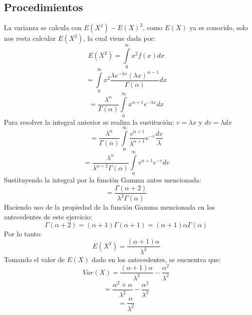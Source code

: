 \documentclass[12pt,letterpaper]{article}
\begin{document}
\subsection{Procedimientos}
La varianza se calcula con $E(X^{2})-E(X)^{2}$, como $E(X)$ ya es conocido, solo nos resta calcular $E(X^{2})$, la cual viene dada por:
\begin{equation}
    E(X^{2})=\int\limits_0^\infty {x^{2}f(x) dx}
\end{equation}
\begin{equation}
     =\int\limits_0^\infty {x^{2}\frac{\lambda e^{-\lambda x}(\lambda x)^{\alpha-1}}{\Gamma(\alpha)} dx}
\end{equation}
\begin{equation}
     =\frac{\lambda^{\alpha}}{\Gamma(\alpha)}\int\limits_0^\infty {x^{\alpha+1}e^{-\lambda x} dx}
\end{equation}
Para resolver la integral anterior se realiza la sustitución: $v=\lambda x$ y $dv=\lambda dx$
\begin{equation}
     =\frac{\lambda^{\alpha}}{\Gamma(\alpha)}\int\limits_0^\infty {\frac{v^{\alpha+1}}{\lambda^{\alpha+1}}e^{-v} \frac{dv}{\lambda}}
\end{equation}
\begin{equation}
        =\frac{\lambda^{\alpha}}{\lambda^{\alpha+2} \Gamma(\alpha)}\int\limits_0^\infty {v^{\alpha+1}e^{-v}} dv
\end{equation}
Sustituyendo la integral por la función Gamma antes mencionada:
\begin{equation}
    =\frac{\Gamma(\alpha+2)}{\lambda^{2}\Gamma(\alpha)}
\end{equation}
Haciendo uso de la propiedad de la función Gamma mencionada en los antecedentes de este ejercicio:
\begin{equation}
    \Gamma(\alpha+2)=(\alpha+1)\Gamma(\alpha+1)=(\alpha+1)\alpha\Gamma(\alpha)
\end{equation}
Por lo tanto:
\begin{equation}
    E(X^{2})=\frac{(\alpha+1)\alpha}{\lambda^{2}}
\end{equation}
Tomando el valor de $E(X)$ dado en los antecedentes, se encuentra que:
\begin{equation}
    Var(X)=\frac{(\alpha+1)\alpha}{\lambda^{2}}-\frac{\alpha^{2}}{\lambda^{2}}
\end{equation}
\begin{equation}
    =\frac{\alpha^{2}+\alpha}{\lambda^{2}}-\frac{\alpha^{2}}{\lambda^{2}}
\end{equation}
\begin{equation}
    =\frac{\alpha}{\lambda^{2}}
\end{equation}


\newpage


\end{document}
